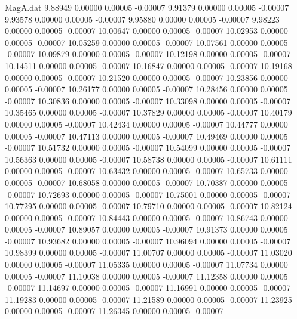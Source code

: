 \begin{filecontents}{MagA.dat}
   9.88949    0.00000    0.00005   -0.00007
   9.91379    0.00000    0.00005   -0.00007
   9.93578    0.00000    0.00005   -0.00007
   9.95880    0.00000    0.00005   -0.00007
   9.98223    0.00000    0.00005   -0.00007
  10.00647    0.00000    0.00005   -0.00007
  10.02953    0.00000    0.00005   -0.00007
  10.05259    0.00000    0.00005   -0.00007
  10.07561    0.00000    0.00005   -0.00007
  10.09879    0.00000    0.00005   -0.00007
  10.12198    0.00000    0.00005   -0.00007
  10.14511    0.00000    0.00005   -0.00007
  10.16847    0.00000    0.00005   -0.00007
  10.19168    0.00000    0.00005   -0.00007
  10.21520    0.00000    0.00005   -0.00007
  10.23856    0.00000    0.00005   -0.00007
  10.26177    0.00000    0.00005   -0.00007
  10.28456    0.00000    0.00005   -0.00007
  10.30836    0.00000    0.00005   -0.00007
  10.33098    0.00000    0.00005   -0.00007
  10.35465    0.00000    0.00005   -0.00007
  10.37829    0.00000    0.00005   -0.00007
  10.40179    0.00000    0.00005   -0.00007
  10.42434    0.00000    0.00005   -0.00007
  10.44777    0.00000    0.00005   -0.00007
  10.47113    0.00000    0.00005   -0.00007
  10.49469    0.00000    0.00005   -0.00007
  10.51732    0.00000    0.00005   -0.00007
  10.54099    0.00000    0.00005   -0.00007
  10.56363    0.00000    0.00005   -0.00007
  10.58738    0.00000    0.00005   -0.00007
  10.61111    0.00000    0.00005   -0.00007
  10.63432    0.00000    0.00005   -0.00007
  10.65733    0.00000    0.00005   -0.00007
  10.68058    0.00000    0.00005   -0.00007
  10.70387    0.00000    0.00005   -0.00007
  10.72693    0.00000    0.00005   -0.00007
  10.75001    0.00000    0.00005   -0.00007
  10.77295    0.00000    0.00005   -0.00007
  10.79710    0.00000    0.00005   -0.00007
  10.82124    0.00000    0.00005   -0.00007
  10.84443    0.00000    0.00005   -0.00007
  10.86743    0.00000    0.00005   -0.00007
  10.89057    0.00000    0.00005   -0.00007
  10.91373    0.00000    0.00005   -0.00007
  10.93682    0.00000    0.00005   -0.00007
  10.96094    0.00000    0.00005   -0.00007
  10.98399    0.00000    0.00005   -0.00007
  11.00707    0.00000    0.00005   -0.00007
  11.03020    0.00000    0.00005   -0.00007
  11.05335    0.00000    0.00005   -0.00007
  11.07734    0.00000    0.00005   -0.00007
  11.10038    0.00000    0.00005   -0.00007
  11.12358    0.00000    0.00005   -0.00007
  11.14697    0.00000    0.00005   -0.00007
  11.16991    0.00000    0.00005   -0.00007
  11.19283    0.00000    0.00005   -0.00007
  11.21589    0.00000    0.00005   -0.00007
  11.23925    0.00000    0.00005   -0.00007
  11.26345    0.00000    0.00005   -0.00007

\end{filecontents}
